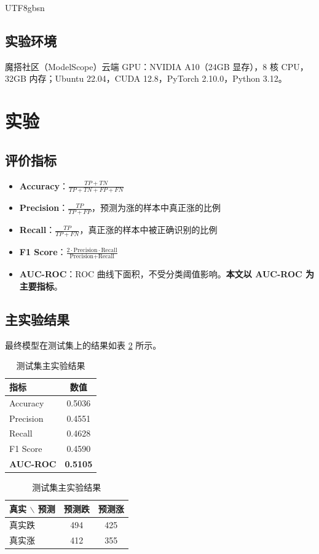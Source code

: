 \documentclass[12pt,a4paper]{article}
\begin{document}
\begin{CJK}{UTF8}{gbsn}
\subsection{实验环境}

魔搭社区（ModelScope）云端 GPU：NVIDIA A10（24GB 显存），8 核 CPU，32GB 内存；Ubuntu 22.04，CUDA 12.8，PyTorch 2.10.0，Python 3.12。

\section{实验}

\subsection{评价指标}

\begin{itemize}[noitemsep]
    \item \textbf{Accuracy}：$\frac{TP+TN}{TP+TN+FP+FN}$
    \item \textbf{Precision}：$\frac{TP}{TP+FP}$，预测为涨的样本中真正涨的比例
    \item \textbf{Recall}：$\frac{TP}{TP+FN}$，真正涨的样本中被正确识别的比例
    \item \textbf{F1 Score}：$\frac{2 \cdot \text{Precision} \cdot \text{Recall}}{\text{Precision} + \text{Recall}}$
    \item \textbf{AUC-ROC}：ROC 曲线下面积，不受分类阈值影响。\textbf{本文以 AUC-ROC 为主要指标}。
\end{itemize}

\subsection{主实验结果}

最终模型在测试集上的结果如表 \ref{tab:main_results} 所示。

\begin{table}[H]
\centering
\caption{测试集主实验结果}
\label{tab:main_results}
\begin{tabular}{lc}
\toprule
\textbf{指标} & \textbf{数值} \\
\midrule
Accuracy  & 0.5036 \\
Precision & 0.4551 \\
Recall    & 0.4628 \\
F1 Score  & 0.4590 \\
\textbf{AUC-ROC} & \textbf{0.5105} \\
\bottomrule
\end{tabular}
\quad
\begin{tabular}{lcc}
\toprule
\textbf{真实 $\backslash$ 预测} & \textbf{预测跌} & \textbf{预测涨} \\
\midrule
真实跌 & 494 & 425 \\
真实涨 & 412 & 355 \\
\bottomrule
\end{tabular}
\end{table}


\end{CJK}
\end{document}
